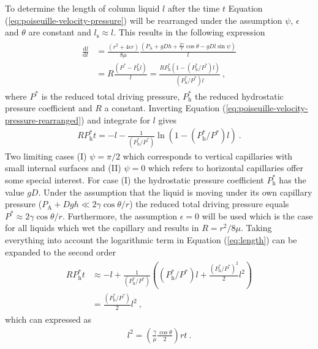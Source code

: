 \documentclass[aip, amsmath, amssymb, reprint, twocolumn, floatfix]{revtex4-1}
\newcommand{\dldt}{\frac{\mathrm{d}l}{\mathrm{d}t}}
\newcommand{\Pa}{P_\mathrm{A}}
\newcommand{\Pt}{P}
\newcommand{\Ph}{P_\mathrm{h}}
\newcommand{\ls}{l_\mathrm{s}}
\begin{document}
To determine the length of column liquid $l$ after the time $t$ Equation (\ref{eq:poiseuille-velocity-pressure}) will be rearranged under the assumption $\psi$, $\epsilon$ and $\theta$ are constant and $\ls \approx l$. This results in the following expression
\begin{gather}
	\begin{aligned}
		\dldt &= \frac{\left(r^2 + 4\epsilon r \right)}{8\mu}\frac{\left(\Pa + gDh + \frac{2\gamma}{r}\cos \theta - gDl \sin \psi \right)}{l}\\
			  &= R \frac{\left(\Pt^* - \Ph^* l\right)}{l} = \frac{R \Ph^* \left( 1 - (\Ph^*/\Pt^*) l\right)}{(\Ph^*/\Pt^*) l}~,
	\end{aligned}
	\label{eq:poiseuille-velocity-pressure-rearranged}
\end{gather}
where $\Pt^*$ is the reduced total driving pressure, $\Ph^*$ the reduced hydrostatic pressure coefficient and $R$ a constant. Inverting Equation (\ref{eq:poiseuille-velocity-pressure-rearranged}) and integrate for $l$ gives
\begin{gather}
	R \Ph^* t = - l - \frac{1}{(\Ph^*/\Pt^*)} \ln\left(1- (\Ph^*/\Pt^*) l \right)~.
	\label{eq:length}
\end{gather}
Two limiting cases (I) $\psi = \pi/2$ which corresponds to vertical capillaries with small internal surfaces and (II) $\psi = 0$ which refers to horizontal capillaries offer some special interest. For case (I) the hydrostatic pressure coefficient $\Ph^*$ has the value $gD$. Under the assumption that the liquid is moving under its own capillary pressure ($\Pa + Dgh \ll  2\gamma\cos\theta/r$) the reduced total driving pressure equals $\Pt^* \approx 2\gamma\cos\theta/r$. Furthermore, the assumption $\epsilon = 0$ will be used which is the case for all liquids which wet the capillary and results in $R = r^2/8\mu$. Taking everything into account the logarithmic term in Equation (\ref{eq:length}) can be expanded to the second order
\begin{gather}
	\begin{aligned}
		R \Ph^* t &\approx - l + \frac{1}{(\Ph^*/\Pt^*)} \left((\Ph^*/\Pt^*) l + \frac{(\Ph^*/\Pt^*)^2}{2} l^2 \right) \\
				  &= \frac{(\Ph^*/\Pt^*)}{2} l^2~,
	\end{aligned}
	\label{eq:length-expanded}
\end{gather}
which can expressed as
\begin{gather}
	\boxed{l^2 = \left(\frac{\gamma}{\mu}\frac{\cos \theta}{2}\right)rt}~.
	\label{eq:BCLW-Imbibition}
\end{gather}
\end{document}
